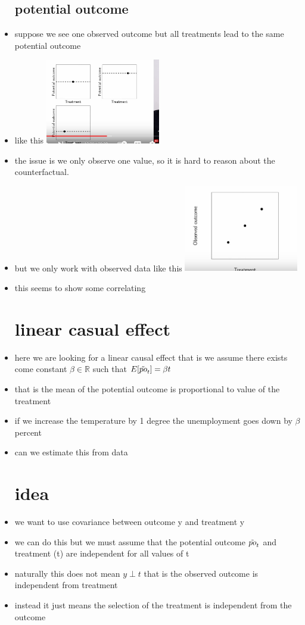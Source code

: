 \documentclass{article}
\begin{document}
\begin{itemize}
\subsection{potential outcome }
\item suppose we see one observed outcome but all treatments lead to the same potential outcome 
\item like this \includegraphics[width=5cm]{notes/week_2/potential_outcome.jpg}
\item the issue is we only observe one value, so it is hard to reason about the counterfactual. 
\item but we only work with observed data like this 
\includegraphics[width=5cm]{notes/week_2/observed_data.jpg}
\item this seems to show some correlating 
\section{linear casual effect}
\item here we are looking for a linear causal effect that is we assume there exists come constant $\beta \in \mathbb{R}$ such that $E[\Tilde{po}_{t}]=\beta t$
\item that is the mean of the potential outcome is proportional to value of the treatment
\item if we increase the temperature by 1 degree the unemployment goes down by $\beta$ percent
\item can we estimate this from data
\section{idea}
\item we want to use covariance between outcome y and treatment y 
\item we can do this but we must assume that the potential outcome $\Tilde{po}_{t}$ and treatment (t) are independent for all values of t 
\item naturally this does not mean $y\perp t$ that is the observed outcome is independent from treatment
\item instead it just means the selection of the treatment is independent from the outcome 

\end{itemize}
\end{document}
